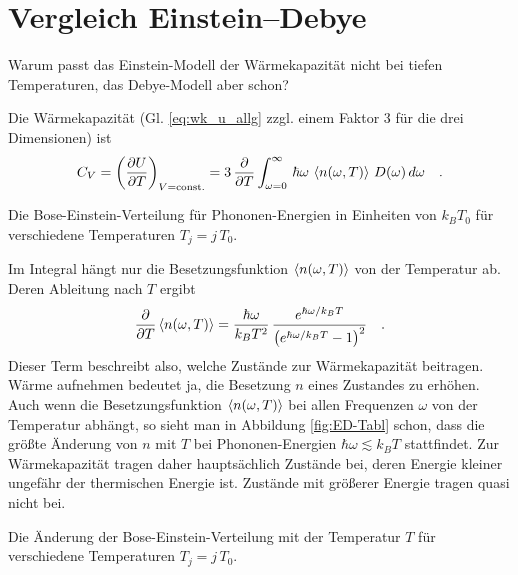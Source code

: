 


\chapter{Vergleich Einstein--Debye}


Warum passt das Einstein-Modell der Wärmekapazität nicht bei tiefen Temperaturen, das Debye-Modell aber schon?




Die Wärmekapazität  (Gl. \ref{eq:wk_u_allg} zzgl. einem Faktor 3 für die drei Dimensionen) ist
\begin{equation}
 C_V = \left( \frac{\partial U}{\partial T} \right)_{V = \text{const.}}
 =  3 \, \frac{\partial }{\partial T}  \int_{\omega=0}^{\infty} \, \hbar \omega \, \braket{ n (\omega, T) } \, D(\omega) \, d\omega  \quad .
\end{equation}
%
\begin{marginfigure}
\caption{Die Bose-Einstein-Verteilung für Phononen-Energien in Einheiten von $k_B T_0$ für verschiedene Temperaturen $T_j = j \, T_0$.}
\end{marginfigure}
%
Im Integral hängt nur die Besetzungsfunktion $ \braket{ n (\omega, T) } $ von der Temperatur ab. Deren Ableitung nach $T$ ergibt
\begin{equation}
\frac{\partial  }{\partial T} \braket{n (\omega, T)} = 
\frac{\hbar \omega}{k_B T^2} \, \frac{e^{\hbar \omega / k_B T}}{ \left( e^{\hbar \omega / k_B T} -1 \right)^2} \label{eq:ED_n_abl} \quad .
\end{equation}
Dieser Term beschreibt also, welche Zustände zur Wärmekapazität beitragen. Wärme aufnehmen bedeutet ja, die Besetzung $n$ eines Zustandes zu erhöhen. Auch wenn die Besetzungsfunktion $ \braket{ n (\omega, T) } $ 
bei allen Frequenzen $\omega$ von der Temperatur abhängt, so sieht man in Abbildung \ref{fig:ED-Tabl} schon, dass die größte Änderung von $n$ mit $T$ bei Phononen-Energien $\hbar \omega \lesssim k_B T$ stattfindet. Zur Wärmekapazität tragen daher hauptsächlich Zustände bei, deren Energie kleiner ungefähr der thermischen Energie ist. Zustände mit größerer Energie tragen quasi nicht bei.
%
\begin{marginfigure}

\caption{Die Änderung der  Bose-Einstein-Verteilung mit der Temperatur $T$  für verschiedene Temperaturen $T_j = j \, T_0$. \label{fig:ED-Tabl}}
\end{marginfigure}


